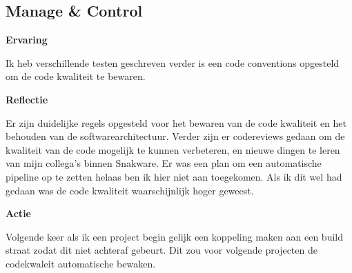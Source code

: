 \subsection{Manage \& Control}
\textbf{Ervaring}

\whitespace
Ik heb verschillende testen geschreven verder is een code conventions opgesteld om de code kwaliteit te bewaren.

\whitespace
\textbf{Reflectie}

\whitespace
Er zijn duidelijke regels opgesteld voor het bewaren van de code kwaliteit en het behouden van de softwarearchitectuur.
Verder zijn er codereviews gedaan om de kwaliteit van de code mogelijk te kunnen verbeteren, en nieuwe dingen te leren van mijn collega's binnen Snakware.
Er was een plan om een automatische pipeline op te zetten helaas ben ik hier niet aan toegekomen.
Als ik dit wel had gedaan was de code kwaliteit waarschijnlijk hoger geweest. 

\whitespace
\textbf{Actie}

\whitespace
Volgende keer als ik een project begin gelijk een koppeling maken aan een build straat zodat dit niet achteraf gebeurt.
Dit zou voor volgende projecten de codekwaleit automatische bewaken.
